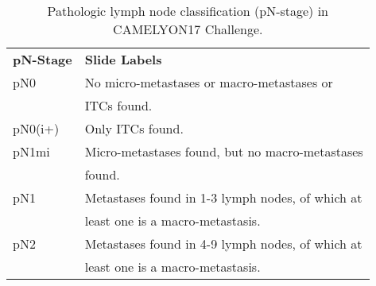 \documentclass[times,twocolumn,final,authoryear]{tmp}
\begin{document}
\begin{table}
\centering
\caption{Pathologic lymph node classification (pN-stage) in CAMELYON17 Challenge.}
\label{path_tab:pn-stage}
\begin{tabular}{@{}ll@{}}
  
\textbf{pN-Stage} & \textbf{Slide Labels}                                                   \\    
pN0      & No micro-metastases or macro-metastases or \\
         & ITCs found.                            \\
pN0(i+)  & Only ITCs found.                                                                  \\
pN1mi    & Micro-metastases found, but no macro-metastases \\
         & found.                            \\
pN1      & Metastases found in 1-3 lymph nodes, of which at \\ 
         & least one is a macro-metastasis. \\
pN2      & Metastases found in 4-9 lymph nodes, of which at \\
         & least one is a macro-metastasis. \\  
\end{tabular}
\end{table}
\end{document}
